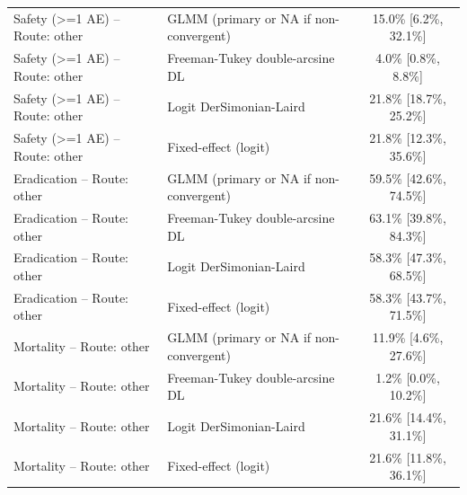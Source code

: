 \begin{tabular}{llc}
Safety (>=1 AE) -- Route: other & GLMM (primary or NA if non-convergent) & 15.0\% [6.2\%, 32.1\%] \\
Safety (>=1 AE) -- Route: other & Freeman-Tukey double-arcsine DL & 4.0\% [0.8\%, 8.8\%] \\
Safety (>=1 AE) -- Route: other & Logit DerSimonian-Laird & 21.8\% [18.7\%, 25.2\%] \\
Safety (>=1 AE) -- Route: other & Fixed-effect (logit) & 21.8\% [12.3\%, 35.6\%] \\
Eradication -- Route: other & GLMM (primary or NA if non-convergent) & 59.5\% [42.6\%, 74.5\%] \\
Eradication -- Route: other & Freeman-Tukey double-arcsine DL & 63.1\% [39.8\%, 84.3\%] \\
Eradication -- Route: other & Logit DerSimonian-Laird & 58.3\% [47.3\%, 68.5\%] \\
Eradication -- Route: other & Fixed-effect (logit) & 58.3\% [43.7\%, 71.5\%] \\
Mortality -- Route: other & GLMM (primary or NA if non-convergent) & 11.9\% [4.6\%, 27.6\%] \\
Mortality -- Route: other & Freeman-Tukey double-arcsine DL & 1.2\% [0.0\%, 10.2\%] \\
Mortality -- Route: other & Logit DerSimonian-Laird & 21.6\% [14.4\%, 31.1\%] \\
Mortality -- Route: other & Fixed-effect (logit) & 21.6\% [11.8\%, 36.1\%] \\
\bottomrule
\end{tabular}
